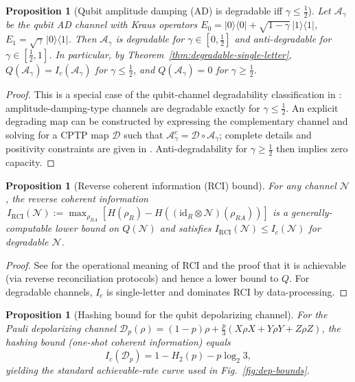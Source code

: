 \documentclass[11pt]{article}
\theoremstyle{plain}
\newtheorem{proposition}[theorem]{Proposition}
\theoremstyle{definition}
\numberwithin{equation}{section}
\begin{document}
\begin{proposition}[Qubit amplitude damping (AD) is degradable iff $\gamma\!\le\!\tfrac12$]\label{prop:ad-degradability}
Let $\mathcal{A}_\gamma$ be the qubit AD channel with Kraus operators
$E_0 = |0\rangle\!\langle 0| + \sqrt{1-\gamma}\,|1\rangle\!\langle 1|$, 
$E_1 = \sqrt{\gamma}\,|0\rangle\!\langle 1|$.
Then $\mathcal{A}_\gamma$ is degradable for $\gamma\in[0,\tfrac12]$ and anti-degradable for
$\gamma\in[\tfrac12,1]$.
In particular, by Theorem~\ref{thm:degradable-single-letter},
$Q(\mathcal{A}_\gamma)=I_c(\mathcal{A}_\gamma)$ for $\gamma\le\tfrac12$, and $Q(\mathcal{A}_\gamma)=0$ for $\gamma\ge\tfrac12$.
\end{proposition}

\begin{proof}
This is a special case of the qubit-channel degradability classification
in \cite{CubittRuskaiSmith2008}: amplitude-damping-type channels are degradable exactly for $\gamma\le\tfrac12$.
An explicit degrading map can be constructed by expressing the complementary channel
and solving for a CPTP map $\mathcal{D}$ such that $\mathcal{A}_\gamma^c=\mathcal{D}\!\circ\!\mathcal{A}_\gamma$;
complete details and positivity constraints are given in \cite[Sec.~III]{CubittRuskaiSmith2008}.
Anti-degradability for $\gamma\ge \tfrac12$ then implies zero capacity.
\end{proof}

\begin{proposition}[Reverse coherent information (RCI) bound]\label{prop:rci}
For any channel $\mathcal{N}$, the \emph{reverse coherent information}
$\,I_{\mathrm{RCI}}(\mathcal{N}):=\max_{\rho_{RA}}[ H(\rho_R)-H((\mathrm{id}_R\!\otimes\!\mathcal{N})(\rho_{RA})) ]$
is a generally-computable lower bound on $Q(\mathcal{N})$ and satisfies
$I_{\mathrm{RCI}}(\mathcal{N})\le I_c(\mathcal{N})$ for degradable $\mathcal{N}$.
\end{proposition}

\begin{proof}
See \cite{GarciaPatron2009PRL} for the operational meaning of RCI and the proof that it
is achievable (via reverse reconciliation protocols) and hence a lower bound to $Q$.
For degradable channels, $I_c$ is single-letter and dominates RCI by data-processing.
\end{proof}

\begin{proposition}[Hashing bound for the qubit depolarizing channel]\label{prop:hashing}
For the Pauli depolarizing channel $\mathcal{D}_p(\rho)=(1-p)\rho + \tfrac{p}{3}(X\rho X+Y\rho Y+Z\rho Z)$,
the hashing bound (one-shot coherent information) equals
\begin{equation}
 I_c(\mathcal{D}_p) = 1 - H_2(p) - p \log_2 3,
\end{equation}
yielding the standard achievable-rate curve used in Fig.~\ref{fig:dep-bounds}.
\end{proposition}
\end{document}
